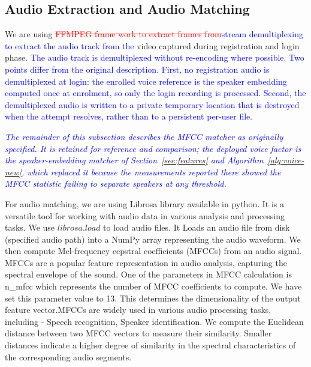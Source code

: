 \documentclass[10pt,journal,compsoc]{IEEEtran}
\begin{document}
\subsection{Audio Extraction and Audio Matching}
We are using \textcolor{red}{\sout{FFMPEG frame work to extract frames from}}\textcolor{blue}{stream demultiplexing to extract the audio track from the}  video captured during registration and login phase. \textcolor{blue}{The audio track is demultiplexed without re-encoding where possible. Two points differ from the original description. First, no registration audio is demultiplexed at login: the enrolled voice reference is the speaker embedding computed once at enrolment, so only the login recording is processed. Second, the demultiplexed audio is written to a private temporary location that is destroyed when the attempt resolves, rather than to a persistent per-user file.}
\par \textcolor{blue}{\emph{The remainder of this subsection describes the MFCC matcher as originally specified. It is retained for reference and comparison; the deployed voice factor is the speaker-embedding matcher of Section~\ref{sec:features} and Algorithm~\ref{alg:voice-new}, which replaced it because the measurements reported there showed the MFCC statistic failing to separate speakers at any threshold.}}
\par {For audio matching, we are using Librosa library available in python. It is a versatile tool for working with audio data in various analysis and processing tasks. We use $librosa.load$ to load audio files. It Loads an audio file from disk (specified audio path) into a NumPy array representing the audio waveform. We then compute Mel-frequency cepstral coefficients (MFCCs) from an audio signal. MFCCs are a popular feature representation in audio analysis, capturing the spectral envelope of the sound. One of the parameters in MFCC calculation is n\_mfcc  which represents the number of MFCC coefficients to compute. We have set this parameter value to 13. This determines the dimensionality of the output feature vector.MFCCs are widely used in various audio processing tasks, including - Speech recognition, Speaker identification. We compute the Euclidean distance between two MFCC vectors to measure their similarity. Smaller distances indicate a higher degree of similarity in the spectral characteristics of the corresponding audio segments.}


\end{document}
